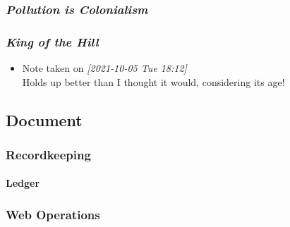 \documentclass[11pt]{article}
\begin{document}
\subsubsection*{\emph{Pollution is Colonialism}}
\label{sec:org8a8074e}
\subsubsection*{\emph{King of the Hill}}
\label{sec:orgf843741}
\begin{itemize}
\item Note taken on \textit{[2021-10-05 Tue 18:12] } \\
Holds up better than I thought it would, considering its age!
\end{itemize}
\stopcontents[level-2]
\subsection*{Document}
\label{sec:org18cd10a}
\startcontents[level-2]
\subsubsection*{Recordkeeping}
\label{sec:org371a178}
\paragraph*{Ledger}
\label{sec:org9dad6d9}
\subsubsection*{Web Operations}
\label{sec:orgb136123}
\end{document}
